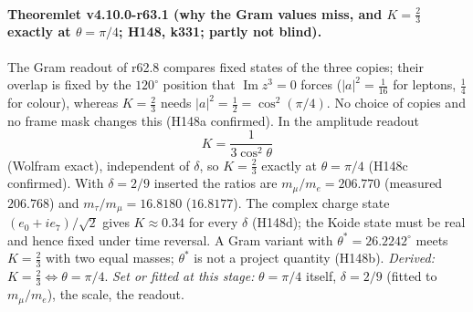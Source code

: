 \paragraph{Theoremlet v4.10.0-r63.1 (why the Gram values miss, and \(K=\tfrac23\) exactly at \(\theta=\pi/4\); H148, k331; partly not blind).}
The Gram readout of r62.8 compares fixed states of the three copies; their overlap is fixed by the \(120^\circ\) position that
\(\operatorname{Im}z^3=0\) forces (\(|a|^2=\tfrac1{16}\) for leptons, \(\tfrac14\) for colour), whereas \(K=\tfrac23\) needs
\(|a|^2=\tfrac12=\cos^2(\pi/4)\).  No choice of copies and no frame mask changes this (H148a confirmed).  In the amplitude readout
\[
K=\frac{1}{3\cos^2\theta}
\]
(Wolfram exact), independent of \(\delta\), so \(K=\tfrac23\) exactly at \(\theta=\pi/4\) (H148c confirmed).  With \(\delta=2/9\) inserted the
ratios are \(m_\mu/m_e=206.770\) (measured \(206.768\)) and \(m_\tau/m_\mu=16.8180\) (\(16.8177\)).  The complex charge state
\((e_0+ie_7)/\sqrt2\) gives \(K\approx0.34\) for every \(\delta\) (H148d); the Koide state must be real and hence fixed under time reversal.  A
Gram variant with \(\theta^*=26.2242^\circ\) meets \(K=\tfrac23\) with two equal masses; \(\theta^*\) is not a project quantity (H148b).
\emph{Derived:} \(K=\tfrac23\Leftrightarrow\theta=\pi/4\).  \emph{Set or fitted at this stage:} \(\theta=\pi/4\) itself, \(\delta=2/9\) (fitted to
\(m_\mu/m_e\)), the scale, the readout.


